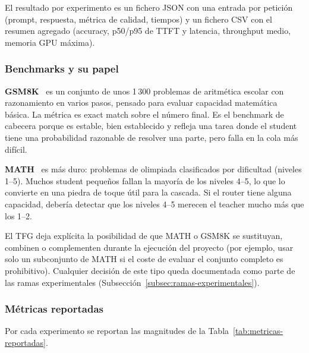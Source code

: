 El resultado por experimento es un fichero JSON con una entrada por petición (prompt, respuesta, métrica de calidad, tiempos) y un fichero CSV con el resumen agregado (accuracy, p50/p95 de TTFT y latencia, throughput medio, memoria GPU máxima).

\subsubsection{Benchmarks y su papel}

\textbf{GSM8K}~\cite{cobbe2021gsm8k} es un conjunto de unos 1\,300 problemas de aritmética escolar con razonamiento en varios pasos, pensado para evaluar capacidad matemática básica. La métrica es exact match sobre el número final. Es el benchmark de cabecera porque es estable, bien establecido y refleja una tarea donde el student tiene una probabilidad razonable de resolver una parte, pero falla en la cola más difícil.

\textbf{MATH}~\cite{hendrycks2021math} es más duro: problemas de olimpiada clasificados por dificultad (niveles 1--5). Muchos student pequeños fallan la mayoría de los niveles 4--5, lo que lo convierte en una piedra de toque útil para la cascada. Si el router tiene alguna capacidad, debería detectar que los niveles 4--5 merecen el teacher mucho más que los 1--2.

El TFG deja explícita la posibilidad de que MATH o GSM8K se sustituyan, combinen o complementen durante la ejecución del proyecto (por ejemplo, usar solo un subconjunto de MATH si el coste de evaluar el conjunto completo es prohibitivo). Cualquier decisión de este tipo queda documentada como parte de las ramas experimentales (Subsección~\ref{subsec:ramas-experimentales}).

\subsubsection{Métricas reportadas}

Por cada experimento se reportan las magnitudes de la Tabla~\ref{tab:metricas-reportadas}.

